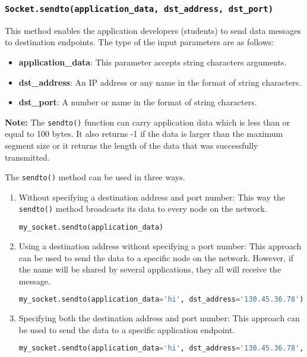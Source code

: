 \documentclass[11pt]{article}
\begin{document}
\subsubsection{\texttt{Socket.\textbf{sendto(application\_data, dst\_address, dst\_port)}}}
This method enables the application developers (students) to send data messages to destination endpoints. The type of the input parameters are as follows:
\begin{itemize}
    \item \textbf{application\_data}: This parameter accepts string characters arguments.
    \item \textbf{dst\_address}: An IP address or any name in the format of string characters.
    \item \textbf{dst\_port}: A number or name in the format of string characters.
\end{itemize}

\textbf{Note:}
The \texttt{sendto()} function can carry application data which is less than or equal to 100 bytes. It also returns -1 if the data is larger than the maximum segment size or it returns the length of the data that was successfully transmitted.

The \texttt{sendto()} method can be used in three ways.
\begin{enumerate}
    \item Without specifying a destination address and port number: This way the \texttt{sendto()} method broadcasts its data to every node on the network.
        \begin{lstlisting}[caption={}, language=Python]
my_socket.sendto(application_data)
        \end{lstlisting}

    \item Using a destination address without specifying a port number: This approach can be used to send the data to a specific node on the network. However, if the name will be shared by several applications, they all will receive the message.
        \begin{lstlisting}[caption={}, language=Python]
my_socket.sendto(application_data='hi', dst_address='130.45.36.78')
        \end{lstlisting}

    \item Specifying both the destination address and port number: This approach can be used to send the data to a specific application endpoint.
        \begin{lstlisting}[caption={}, language=Python]
my_socket.sendto(application_data='hi', dst_address='130.45.36.78', dst_port='app1')
        \end{lstlisting}
\end{enumerate}
\end{document}
